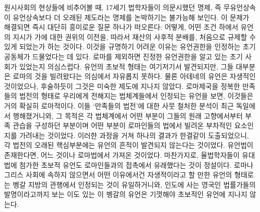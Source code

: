 원시사회의 현상들에 비추어볼 때,
17세기 법학자들이 의문시했던 명제, 즉
무유언상속이 유언상속보다 더 오래된 제도라는 명제를
논박하기는 불가능해 보인다.
이 문제가 해결되면 즉시 대단히 흥미로운 질문 하나가 떠오른다:
어떻게, 어떤 조건 하에서
유언의 지시가
가에 대한 권위의 이전을,
따라서 재산의 사후적 분배를,
처음으로 규제할 수 있게 되었는가 하는 것이다.
이것을 규명하기 어려운 이유는
유언권한을 인정하는 초기 공동체가 드물었다는 데 있다.
로마를 제외하면 진정한 유언권한을 알고 있는 초기 사회가 있었는지 의심스럽다.
유언의 초보적 형태는 여기저기서 발견되지만,
그들 대부분은 로마의 것을 빌려왔다는 의심에서 자유롭지 못하다.
물론 아테네의 유언은 자생적인 것이었으나,
후술하듯이 그것은 미숙한 제도에 지나지 않았다.
로마제국을 정복한 만족들의 법전의 형태로 우리에게 전해지는
법체계들에서 인정되는 유언을 보면, 이것들은 거의 확실히 로마적이다.
이들 `만족들의 법전'에 대한
사뭇 철처한 분석이 최근 독일에서 행해졌거니와,
그 목적은 각 법체계에서 어떤 부분이
그들의 원래 고향에서부터 부족 관습을 구성하던 부분이며
어떤 부분이 로마인들의 법에서 빌려온 부차적인 요소인지를
가려내는 것이었다.
이러한 과정을 거쳐 하나의 결과가 한결같이 도출되었으니,
각 법전의 오래된 핵심부분에는 유언의 흔적이 발견되지 않는다는 것이었다.
유언법이 존재한다면, 어느 것이나 로마법에서 가져온 것이었다.
마찬가지로,  율법학자들이 유대법에 첨가한
초보적 유언도 로마인들과의 접촉에서 유래했다는 것이 정설이다.
로마나 그리스 사회에 속하지 않으면서
어떤 이유에서건 자생적이라고 할 만한 유언의 형태로는
벵갈 지방의 관행에서 인정되는 것이 유일하거니와,
인도에 사는 영국인 법률가들의 발명이라고까지 보는 이도 있는
이 벵갈의 유언은
기껏해야 초보적인 유언에 지나지 않는다.

